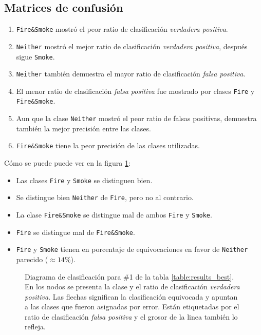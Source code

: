 \documentclass{article}
\begin{document}
\subsection{Matrices de confusión}

\begin{enumerate}
\item \verb|Fire&Smoke| mostró el peor ratio de clasificación \emph{verdadera positiva}.
\item \verb|Neither| mostró el mejor ratio de clasificación \emph{verdadera positiva}, 
                     después sigue \verb|Smoke|.
\item \verb|Neither| también demuestra el mayor ratio de clasificación
                     \emph{falsa positiva}.
\item El menor ratio de clasificación \emph{falsa positiva} fue mostrado por clases
      \verb|Fire| y \verb|Fire&Smoke|.
\item Aun que la clase \verb|Neither| mostró el peor ratio de falsas positivas, 
      demuestra también la mejor precisión entre las clases.
\item \verb|Fire&Smoke| tiene la peor precisión de las clases utilizadas.
\end{enumerate}

Cómo se puede puede ver en la figura \ref{fig:classes}:
\begin{itemize}
\item Las clases \verb|Fire| y \verb|Smoke| se distinguen bien.
\item Se distingue bien \verb|Neither| de \verb|Fire|, pero no al contrario.
\item La clase \verb|Fire&Smoke| se distingue mal de ambos \verb|Fire| y \verb|Smoke|.
\item \verb|Fire| se distingue mal de \verb|Fire&Smoke|.
\item \verb|Fire| y \verb|Smoke| tienen en porcentaje de equivocaciones en favor de 
      \verb|Neither| parecido ($\approx 14\%$).
\end{itemize}



\begin{figure}
    
    \caption{Diagrama de clasificación para \#1 de la tabla \ref{table:results_best}.
             En los nodos se presenta la clase y el ratio de clasificación \emph{verdadera 
             positiva}. Las flechas significan la clasificación equivocada y apuntan a las 
             clases que fueron asignadas por error. Están etiquetadas por el ratio de 
             clasificación \emph{falsa positiva} y el grosor de la linea también lo refleja.
            }
    \label{fig:classes}
\end{figure}
\end{document}
